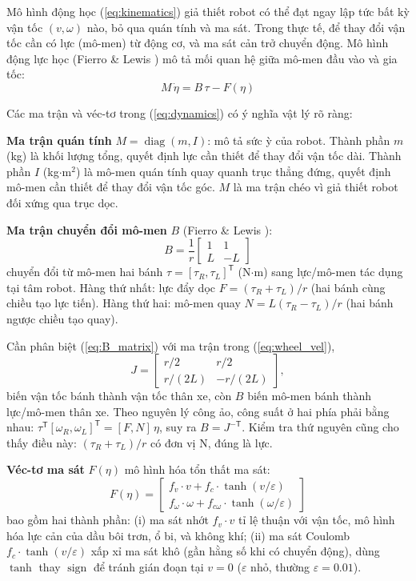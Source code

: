 \documentclass[12pt,a4paper]{article}
\newcommand{\T}{\mathsf{T}}
\DeclareMathOperator{\diag}{diag}
\DeclareMathOperator{\sign}{sign}
\begin{document}
Mô hình động học (\ref{eq:kinematics}) giả thiết robot có thể đạt ngay lập tức bất kỳ vận tốc $(v, \omega)$ nào, bỏ qua quán tính và ma sát. Trong thực tế, để thay đổi vận tốc cần có lực (mô-men) từ động cơ, và ma sát cản trở chuyển động. Mô hình động lực học (Fierro \& Lewis \cite{Fierro1997}) mô tả mối quan hệ giữa mô-men đầu vào và gia tốc:
\begin{equation}\label{eq:dynamics}
    M\,\dot{\eta} = B\,\tau - F(\eta)
\end{equation}

Các ma trận và véc-tơ trong (\ref{eq:dynamics}) có ý nghĩa vật lý rõ ràng:

\textbf{Ma trận quán tính} $M = \diag(m, I)$: mô tả sức ỳ của robot. Thành phần $m$ (kg) là khối lượng tổng, quyết định lực cần thiết để thay đổi vận tốc dài. Thành phần $I$ (kg$\cdot$m$^2$) là mô-men quán tính quay quanh trục thẳng đứng, quyết định mô-men cần thiết để thay đổi vận tốc góc. $M$ là ma trận chéo vì giả thiết robot đối xứng qua trục dọc.

\textbf{Ma trận chuyển đổi mô-men} $B$ (Fierro \& Lewis \cite{Fierro1997}):
\begin{equation}\label{eq:B_matrix}
    B = \frac{1}{r}\begin{bmatrix} 1 & 1 \\ L & -L \end{bmatrix}
\end{equation}
chuyển đổi từ mô-men hai bánh $\tau = [\tau_R, \tau_L]^\T$ (N$\cdot$m) sang lực/mô-men tác dụng tại tâm robot. Hàng thứ nhất: lực đẩy dọc $F = (\tau_R + \tau_L)/r$ (hai bánh cùng chiều tạo lực tiến). Hàng thứ hai: mô-men quay $N = L(\tau_R - \tau_L)/r$ (hai bánh ngược chiều tạo quay).

Cần phân biệt (\ref{eq:B_matrix}) với ma trận trong (\ref{eq:wheel_vel}),
\[
    J = \begin{bmatrix} r/2 & r/2 \\ r/(2L) & -r/(2L) \end{bmatrix},
\]
biến vận tốc bánh thành vận tốc thân xe, còn $B$ biến mô-men bánh thành lực/mô-men thân xe. Theo nguyên lý công ảo, công suất ở hai phía phải bằng nhau: $\tau^\T [\omega_R, \omega_L]^\T = [F, N]\,\eta$, suy ra $B = J^{-\T}$. Kiểm tra thứ nguyên cũng cho thấy điều này: $(\tau_R + \tau_L)/r$ có đơn vị N, đúng là lực.

\textbf{Véc-tơ ma sát} $F(\eta)$ mô hình hóa tổn thất ma sát:
\begin{equation}\label{eq:friction}
    F(\eta) = \begin{bmatrix} f_v \cdot v + f_c \cdot \tanh(v/\varepsilon) \\ f_\omega \cdot \omega + f_{c\omega} \cdot \tanh(\omega/\varepsilon) \end{bmatrix}
\end{equation}
bao gồm hai thành phần: (i) ma sát nhớt $f_v \cdot v$ tỉ lệ thuận với vận tốc, mô hình hóa lực cản của dầu bôi trơn, ổ bi, và không khí; (ii) ma sát Coulomb $f_c \cdot \tanh(v/\varepsilon)$ xấp xỉ ma sát khô (gần hằng số khi có chuyển động), dùng $\tanh$ thay $\sign$ để tránh gián đoạn tại $v=0$ ($\varepsilon$ nhỏ, thường $\varepsilon = 0.01$).
\end{document}
